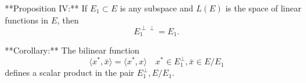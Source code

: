 **Proposition IV:** If $E_1 \subset E$ is any subspace and $L(E)$ is the space of linear functions in $E$, then
$$E_1^{\perp\perp} = E_1.$$

**Corollary:** The bilinear function
$$\langle x^*, \bar{x} \rangle = \langle x^*, x \rangle \quad x^* \in E_1^\perp, \bar{x} \in E/E_1$$
defines a scalar product in the pair $E_1^\perp, E/E_1$.
